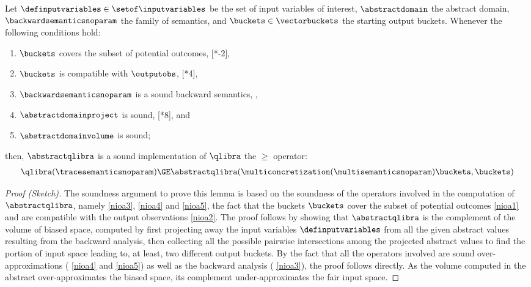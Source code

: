 \begin{lemma}
  Let $\definputvariables\in\setof\inputvariables$ be the set of input variables of interest, $\abstractdomain$ the abstract domain, $\backwardsemanticsnoparam$ the family of semantics, and $\buckets\in\vectorbuckets$ the starting output buckets.
  Whenever the following conditions hold:
  \begin{enumerate}[label=(\roman*)]
    \item \label{nioa1} $\buckets$ covers the subset of potential outcomes, \cf{} [*-2],
    \item \label{nioa2} $\buckets$ is compatible with $\outputobs$, \cf{} [*4],
    \item \label{nioa3} $\backwardsemanticsnoparam$ is a sound backward semantics, \cf{} ,
    \item \label{nioa4} $\abstractdomainproject$ is sound, \cf{} [*8], and
    \item \label{nioa5} $\abstractdomainvolume$ is sound;
  \end{enumerate}
  then, $\abstractqlibra$ is a sound implementation of $\qlibra$ \wrt{} the $\ge$ operator:
  \begin{align*}
    \qlibra(\tracesemanticsnoparam) \GE \abstractqlibra(\multiconcretization(\multisemanticsnoparam)\buckets, \buckets)
  \end{align*}
\end{lemma}
\begin{proof}[Proof (Sketch)]
  The soundness argument to prove this lemma is based on the soundness of the operators involved in the computation of $\abstractqlibra$, namely \ref{nioa3}, \ref{nioa4} and \ref{nioa5}, the fact that the buckets $\buckets$ cover the subset of potential outcomes \ref{nioa1} and are compatible with the output observations \ref{nioa2}.
  The proof follows by showing that $\abstractqlibra$ is the complement of the volume of biased space, computed by first projecting away the input variables $\definputvariables$ from all the given abstract values resulting from the backward analysis, then collecting all the possible pairwise intersections among the projected abstract values to find the portion of input space leading to, at least, two different output buckets.
  By the fact that all the operators involved are sound over-approximations (\cf{} \ref{nioa4} and \ref{nioa5}) as well as the backward analysis (\cf{} \ref{nioa3}), the proof follows directly.
  As the volume computed in the abstract over-approximates the biased space, its complement under-approximates the fair input space.
\end{proof}

